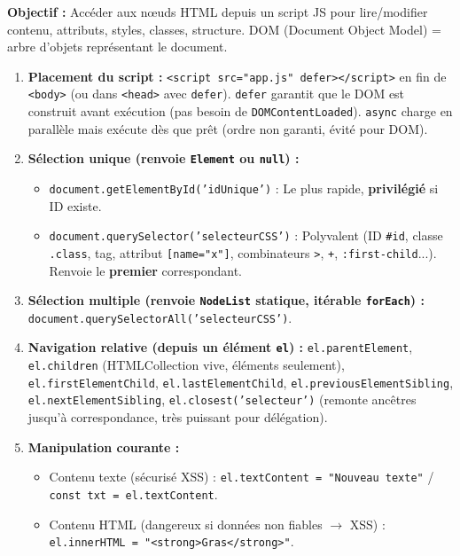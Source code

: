 \documentclass[11pt]{article}
\newcommand{\cle}[1]{{\popxbold\color{popdark}#1}}
\begin{document}
\begin{methode}
    \textbf{Objectif :} Accéder aux nœuds HTML depuis un script JS pour lire/modifier contenu, attributs, styles, classes, structure. \cle{DOM} (Document Object Model) = arbre d'objets représentant le document.
    \begin{enumerate}
        \item \textbf{Placement du script :} \texttt{<script src="app.js" defer></script>} en fin de \texttt{<body>} (ou dans \texttt{<head>} avec \texttt{defer}). \texttt{defer} garantit que le DOM est construit avant exécution (pas besoin de \texttt{DOMContentLoaded}). \texttt{async} charge en parallèle mais exécute dès que prêt (ordre non garanti, évité pour DOM).
        \item \textbf{Sélection unique (renvoie \texttt{Element} ou \texttt{null}) :}
              \begin{itemize}
                  \item \texttt{document.getElementById('idUnique')} : Le plus rapide, \textbf{privilégié} si ID existe.
                  \item \texttt{document.querySelector('selecteurCSS')} : Polyvalent (ID \texttt{\#id}, classe \texttt{.class}, tag, attribut \texttt{[name="x"]}, combinateurs \texttt{>}, \texttt{+}, \texttt{:first-child}...). Renvoie le \textbf{premier} correspondant.
              \end{itemize}
        \item \textbf{Sélection multiple (renvoie \texttt{NodeList} statique, itérable \texttt{forEach}) :}
              \texttt{document.querySelectorAll('selecteurCSS')}.
        \item \textbf{Navigation relative (depuis un élément \texttt{el}) :}
              \texttt{el.parentElement}, \texttt{el.children} (HTMLCollection vive, éléments seulement), \texttt{el.firstElementChild}, \texttt{el.lastElementChild}, \texttt{el.previousElementSibling}, \texttt{el.nextElementSibling}, \texttt{el.closest('selecteur')} (remonte ancêtres jusqu'à correspondance, très puissant pour délégation).
        \item \textbf{Manipulation courante :}
              \begin{itemize}
                  \item Contenu texte (sécurisé XSS) : \texttt{el.textContent = "Nouveau texte"} / \texttt{const txt = el.textContent}.
                  \item Contenu HTML (dangereux si données non fiables $\rightarrow$ \cle{XSS}) : \texttt{el.innerHTML = "<strong>Gras</strong>"}.

\end{itemize}
\end{enumerate}
\end{methode}
\end{document}
